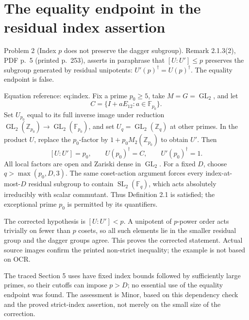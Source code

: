 \documentclass[10pt]{article}
\begin{document}
\section*{The equality endpoint in the residual index assertion}
Problem 2 (Index \(p\) does not preserve the dagger subgroup).  Remark 2.1.3(2), PDF p. 5 (printed p. 253), asserts in paraphrase that \([U:U']\le p\) preserves the subgroup generated by residual unipotents: \(U'(p)^\dagger=U(p)^\dagger\). The equality endpoint is false.\par
Equation reference: eq:index. Fix a prime \(p_0\ge5\), take \(M=G=\operatorname{GL}_2\), and let \[C=\{I+aE_{12}:a\in\mathbb F_{p_0}\}.\] Set \(U_{p_0}\) equal to its full inverse image under reduction \(\operatorname{GL}_2(\mathbb Z_{p_0})\to\operatorname{GL}_2(\mathbb F_{p_0})\), and set \(U_q=\operatorname{GL}_2(\mathbb Z_q)\) at other primes. In the product \(U\), replace the \(p_0\)-factor by \(1+p_0M_2(\mathbb Z_{p_0})\) to obtain \(U'\). Then \[
 [U:U']=p_0,\qquad U(p_0)^\dagger=C,\qquad U'(p_0)^\dagger=1.\] All local factors are open and Zariski dense in \(\operatorname{GL}_2\). For a fixed \(D\), choose \(q>\max(p_0,D,3)\). The same coset-action argument forces every index-at-most-\(D\) residual subgroup to contain \(\operatorname{SL}_2(\mathbb F_q)\), which acts absolutely irreducibly with scalar commutant. Thus Definition 2.1 is satisfied; the exceptional prime \(p_0\) is permitted by its quantifiers.\par
The corrected hypothesis is \([U:U']<p\). A unipotent of \(p\)-power order acts trivially on fewer than \(p\) cosets, so all such elements lie in the smaller residual group and the dagger groups agree. This proves the corrected statement. Actual source images confirm the printed non-strict inequality; the example is not based on OCR.\par
The traced Section 5 uses have fixed index bounds followed by sufficiently large primes, so their cutoffs can impose \(p>D\); no essential use of the equality endpoint was found. The assessment is Minor, based on this dependency check and the proved strict-index assertion, not merely on the small size of the correction.\par
\end{document}
